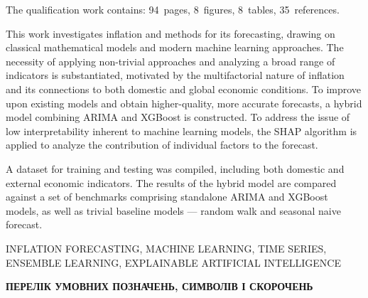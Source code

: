 \documentclass{bachelor_thesis}
\begin{document}
\vspace{12pt}

The qualification work contains: 94~pages, 8~figures, 8~tables, 35~references.

This work investigates inflation and methods for its forecasting, drawing on classical mathematical models and modern machine learning approaches. The necessity of applying non-trivial approaches and analyzing a broad range of indicators is substantiated, motivated by the multifactorial nature of inflation and its connections to both domestic and global economic conditions. To improve upon existing models and obtain higher-quality, more accurate forecasts, a hybrid model combining ARIMA and XGBoost is constructed. To address the issue of low interpretability inherent to machine learning models, the SHAP algorithm is applied to analyze the contribution of individual factors to the forecast.

A dataset for training and testing was compiled, including both domestic and external economic indicators. The results of the hybrid model are compared against a set of benchmarks comprising standalone ARIMA and XGBoost models, as well as trivial baseline models --- random walk and seasonal naive forecast.

\vspace{6pt}
\MakeUppercase{inflation forecasting, machine learning, time series, ensemble learning, explainable artificial intelligence}

\clearpage

\tableofcontents

\newpage
\thispagestyle{plain}

\begin{center}
    {\bfseries\Large\MakeUppercase{Перелік умовних позначень, символів і скорочень}}
\end{center}

\vspace{12pt}
\end{document}
